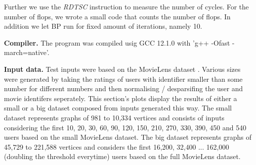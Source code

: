 \documentclass[letterpaper]{article}
\newcommand{\mypar}[1]{{\bf #1.}}
\begin{document}
Further we use the \emph{RDTSC} instruction to measure the number of cycles. For the number of flops, we wrote a small code that counts the number of flops. In addition we let BP run for fixed amount of iterations, namely 10. 

\mypar{Compiler} The program was compiled usig GCC 12.1.0 with 'g++ -Ofast -march=native'.

\mypar{Input data} Test inputs were based on the MovieLens dataset \cite{movieLens}.
Various sizes were generated by taking the ratings of users with identifier smaller than some number for different numbers
and then normalising / desparsifing the user and movie identifers seperately.
This section's plots display the results of either a small or a big dataset composed from inputs generated this way.
The small dataset represents graphs of 981 to 10,334 vertices and consists of inputs %
considering the first 10, 20, 30, 60, 90, 120, 150, 210, 270, 330, 390, 450 and 540 users based on the small MovieLens dataset.
The big dataset represents graphs of 45,729 to 221,588 vertices and considers the first 16,200, 32,400 ... 162,000 (doubling the threshold everytime) users based on the full MovieLens dataset.
\end{document}
